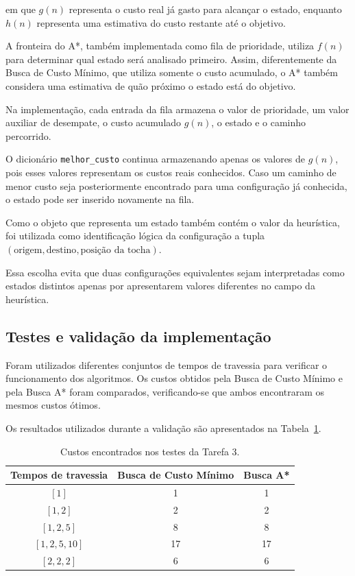 em que $g(n)$ representa o custo real já gasto para alcançar o estado, enquanto
$h(n)$ representa uma estimativa do custo restante até o objetivo.

A fronteira do A*, também implementada como fila de prioridade, utiliza
$f(n)$ para determinar qual estado será analisado primeiro. Assim,
diferentemente da Busca de Custo Mínimo, que utiliza somente o custo
acumulado, o A* também considera uma estimativa de quão próximo
o estado está do objetivo.

Na implementação, cada entrada da fila armazena o valor de prioridade, um
valor auxiliar de desempate, o custo acumulado $g(n)$, o estado e o caminho
percorrido.

O dicionário \texttt{melhor\_custo} continua armazenando apenas os valores de
$g(n)$, pois esses valores representam os custos reais conhecidos. Caso um
caminho de menor custo seja posteriormente encontrado para uma configuração já
conhecida, o estado pode ser inserido novamente na fila.

Como o objeto que representa um estado também contém o valor da heurística,
foi utilizada como identificação lógica da configuração a tupla
$(\text{origem},\text{destino},\text{posição da tocha})$.

Essa escolha evita que duas configurações equivalentes sejam interpretadas
como estados distintos apenas por apresentarem valores diferentes no campo da
heurística.

\subsection{Testes e validação da implementação}

Foram utilizados diferentes conjuntos de tempos de travessia para verificar o
funcionamento dos algoritmos. Os custos obtidos pela Busca de Custo Mínimo e
pela Busca A* foram comparados, verificando-se que ambos encontraram os mesmos
custos ótimos.

Os resultados utilizados durante a validação são apresentados na
Tabela~\ref{tab:testes-tarefa3}.

\begin{table}[H]
	\centering
	\caption{Custos encontrados nos testes da Tarefa 3.}
	\label{tab:testes-tarefa3}
	\begin{tabular}{ccc}
		\toprule
		Tempos de travessia & Busca de Custo Mínimo & Busca A* \\
		\midrule
		$[1]$               & 1                     & 1        \\
		$[1,2]$             & 2                     & 2        \\
		$[1,2,5]$           & 8                     & 8        \\
		$[1,2,5,10]$        & 17                    & 17       \\
		$[2,2,2]$           & 6                     & 6        \\
		\bottomrule
	\end{tabular}
\end{table}

